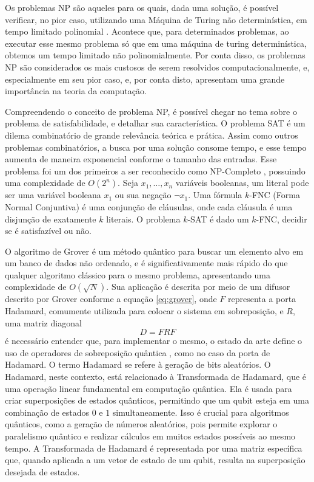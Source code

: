 \documentclass[12pt]{article}
\begin{document}
Os problemas NP são aqueles para os quais, dada uma solução, é possível verificar, no pior caso,  utilizando uma Máquina de Turing não determinística, em tempo limitado polinomial \cite{sipser:07}. Acontece que, para determinados problemas, ao executar esse mesmo problema só que em uma máquina de turing determinística, obtemos um tempo limitado não polinomialmente. Por conta disso, os problemas NP são considerados os mais custosos de serem resolvidos computacionalmente, e, especialmente em seu pior caso, e, por conta disto, apresentam uma grande importância na teoria da computação.

Compreendendo o conceito de problema NP, é possível chegar no tema sobre o problema de satisfabilidade, e detalhar sua característica. O problema SAT é um dilema combinatório de grande relevância teórica e prática. Assim como outros problemas combinatórios, a busca por uma solução consome tempo, e esse tempo aumenta de maneira exponencial conforme o tamanho das entradas. Esse problema foi um dos primeiros a ser reconhecido como NP-Completo \cite{cook:71}, possuindo uma complexidade de $O(2^n)$. Seja \(x_1, \ldots, x_n\) variáveis booleanas, um literal pode ser uma variável booleana \(x_1\) ou sua negação \(\neg x_1\). Uma fórmula $k$-FNC (Forma Normal Conjuntiva) é uma conjunção de cláusulas, onde cada cláusula é uma disjunção de exatamente $k$ literais. O problema $k$-SAT é dado um $k$-FNC, decidir se é satisfazível ou não.

O algoritmo de Grover \cite{grover:96} é um método quântico para buscar um elemento alvo em um banco de dados não ordenado, e é significativamente mais rápido do que qualquer algoritmo clássico para o mesmo problema, apresentando uma complexidade de $O(\sqrt{N})$. Sua aplicação é descrita por meio de um difusor descrito por Grover conforme a equação
\ref{eq:grover}, onde $F$ representa a porta Hadamard, comumente utilizada para colocar o sistema em sobreposição, e $R$, uma matriz diagonal
\begin{equation}
D = FRF \label{eq:grover}
\end{equation}
é necessário entender que, para implementar o mesmo, o estado da arte define o uso de operadores de sobreposição quântica , como no caso da porta de Hadamard.\cite{silva:18} O termo Hadamard se refere à geração de bits aleatórios. O Hadamard, neste contexto, está relacionado à Transformada de Hadamard, que é uma operação linear fundamental em computação quântica. Ela é usada para criar superposições de estados quânticos, permitindo que um qubit esteja em uma combinação de estados $0$ e $1$ simultaneamente. Isso é crucial para algoritmos quânticos, como a geração de números aleatórios, pois permite explorar o paralelismo quântico e realizar cálculos em muitos estados possíveis ao mesmo tempo. A Transformada de Hadamard é representada por uma matriz específica que, quando aplicada a um vetor de estado de um qubit, resulta na superposição desejada de estados.
\end{document}
